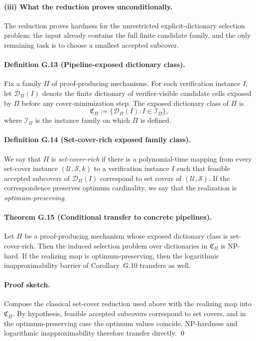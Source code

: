 \paragraph{(iii) What the reduction proves unconditionally.}
The reduction proves hardness for the unrestricted explicit-dictionary selection problem: the input already contains the full finite candidate family, and the only remaining task is to choose a smallest accepted subcover.

\paragraph{Definition G.13 (Pipeline-exposed dictionary class).}
Fix a family $\Pi$ of proof-producing mechanisms. For each verification instance $I$, let $\mathcal D_\Pi(I)$ denote the finite dictionary of verifier-visible candidate cells exposed by $\Pi$ before any cover-minimization step. The exposed dictionary class of $\Pi$ is
\[
\mathfrak C_\Pi:=\{\mathcal D_\Pi(I): I\in\mathcal I_\Pi\},
\]
where $\mathcal I_\Pi$ is the instance family on which $\Pi$ is defined.

\paragraph{Definition G.14 (Set-cover-rich exposed family class).}
We say that $\Pi$ is \emph{set-cover-rich} if there is a polynomial-time mapping from every set-cover instance $(\mathcal U,\mathcal S,k)$ to a verification instance $I$ such that feasible accepted subcovers of $\mathcal D_\Pi(I)$ correspond to set covers of $(\mathcal U,\mathcal S)$. If the correspondence preserves optimum cardinality, we say that the realization is \emph{optimum-preserving}.

\paragraph{Theorem G.15 (Conditional transfer to concrete pipelines).}
Let $\Pi$ be a proof-producing mechanism whose exposed dictionary class is set-cover-rich. Then the induced selection problem over dictionaries in $\mathfrak C_\Pi$ is NP-hard. If the realizing map is optimum-preserving, then the logarithmic inapproximability barrier of Corollary~G.10 transfers as well.

\paragraph{Proof sketch.}
Compose the classical set-cover reduction used above with the realizing map into $\mathfrak C_\Pi$. By hypothesis, feasible accepted subcovers correspond to set covers, and in the optimum-preserving case the optimum values coincide. NP-hardness and logarithmic inapproximability therefore transfer directly. \qed

